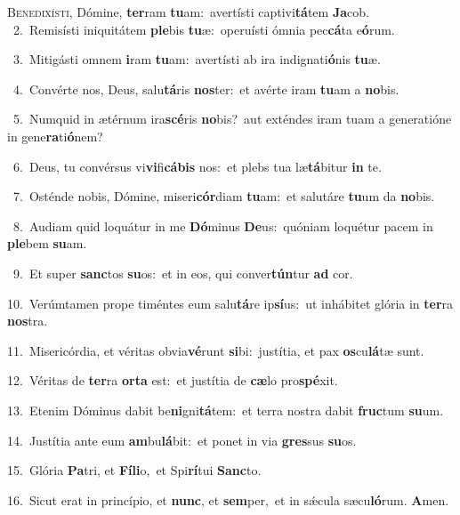 \lettrine{\initial\textcolor{\initialcolor}{B}}{enedixísti,} Dómine, \textbf{ter}\-ram \textbf{tu}\-am:~\star avertísti captivi\-\textbf{tá}\-tem \textbf{Ja}\-cob.\\
{\numbfont\textcolor{\numbcolor}{~2.}}~Remisísti iniquitátem \textbf{ple}\-bis \textbf{tu}\-æ:~\star operuísti ómnia pec\-\textbf{cá}\-ta e\-\textbf{ó}\-rum.\par
{\numbfont\textcolor{\numbcolor}{~3.}}~Mitigásti omnem \textbf{i}\-ram \textbf{tu}\-am:~\star avertísti ab ira indignati\-\textbf{ó}\-nis \textbf{tu}\-æ.\par
{\numbfont\textcolor{\numbcolor}{~4.}}~Convérte nos, Deus, salu\-\textbf{tá}\-ris \textbf{nos}\-ter:~\star et avérte iram \textbf{tu}\-am a \textbf{no}\-bis.\par
{\numbfont\textcolor{\numbcolor}{~5.}}~Numquid in ætérnum ira\-\textbf{scé}\-ris \textbf{no}\-bis?~\star aut exténdes iram tuam a generatióne in gene\-\textbf{ra}\-ti\-\textbf{ó}\-nem?\par
{\numbfont\textcolor{\numbcolor}{~6.}}~Deus, tu convérsus vi\-\textbf{vi}\-fi\-\textbf{cá}\-\textbf{bis} nos:~\star et plebs tua læ\-\textbf{tá}\-bitur \textbf{in} te.\par
{\numbfont\textcolor{\numbcolor}{~7.}}~Osténde nobis, Dómine, miseri\-\textbf{cór}\-diam \textbf{tu}\-am:~\star et salutáre \textbf{tu}\-um da \textbf{no}\-bis.\par
{\numbfont\textcolor{\numbcolor}{~8.}}~Audiam quid loquátur in me \textbf{Dó}\-minus \textbf{De}\-us:~\star quóniam loquétur pacem in \textbf{ple}\-bem \textbf{su}\-am.\par
{\numbfont\textcolor{\numbcolor}{~9.}}~Et super \textbf{sanc}\-tos \textbf{su}\-os:~\star et in eos, qui conver\-\textbf{tún}\-tur \textbf{ad} cor.\par
{\numbfont\textcolor{\numbcolor}{10.}}~Verúmtamen prope timéntes eum salu\-\textbf{tá}\-re ip\-\textbf{sí}\-us:~\star ut inhábitet glória in \textbf{ter}\-ra \textbf{nos}\-tra.\par
{\numbfont\textcolor{\numbcolor}{11.}}~Misericórdia, et véritas obvia\-\textbf{vé}\-runt \textbf{si}\-bi:~\star justítia, et pax \textbf{os}\-cu\-\textbf{lá}\-tæ sunt.\par
{\numbfont\textcolor{\numbcolor}{12.}}~Véritas de \textbf{ter}\-ra \textbf{or}\-\textbf{ta} est:~\star et justítia de \textbf{cæ}\-lo pro\-\textbf{spé}\-xit.\par
{\numbfont\textcolor{\numbcolor}{13.}}~Etenim Dóminus dabit be\-\textbf{ni}\-gni\-\textbf{tá}\-tem:~\star et terra nostra dabit \textbf{fruc}\-tum \textbf{su}\-um.\par
{\numbfont\textcolor{\numbcolor}{14.}}~Justítia ante eum \textbf{am}\-bu\-\textbf{lá}\-bit:~\star et ponet in via \textbf{gres}\-sus \textbf{su}\-os.\par
{\numbfont\textcolor{\numbcolor}{15.}}~Glória \textbf{Pa}\-tri, et \textbf{Fí}\-\textbf{li}o,~\star et Spi\-\textbf{rí}\-tui \textbf{Sanc}\-to.\par
{\numbfont\textcolor{\numbcolor}{16.}}~Sicut erat in princípio, et \textbf{nunc}\-, et \textbf{sem}\-per,~\star et in sǽcula sæcu\-\textbf{ló}\-rum. \textbf{A}\-men.\par
